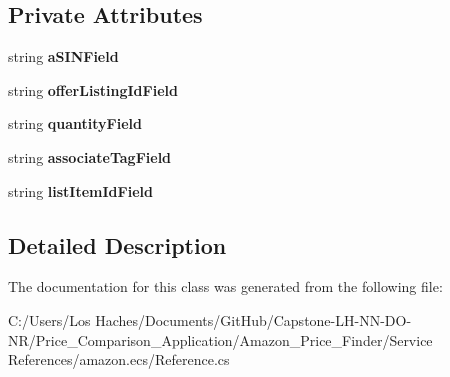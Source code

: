 \subsection*{Private Attributes}
\begin{DoxyCompactItemize}
\item 
\hypertarget{class_price___comparison_1_1amazon_1_1ecs_1_1_cart_add_request_item_ac2fea2ed9f0acc747e5529b82cb50a39}{string {\bfseries a\-S\-I\-N\-Field}}\label{class_price___comparison_1_1amazon_1_1ecs_1_1_cart_add_request_item_ac2fea2ed9f0acc747e5529b82cb50a39}

\item 
\hypertarget{class_price___comparison_1_1amazon_1_1ecs_1_1_cart_add_request_item_afa9c9ce1dae520a8c700be3c7fe5b7da}{string {\bfseries offer\-Listing\-Id\-Field}}\label{class_price___comparison_1_1amazon_1_1ecs_1_1_cart_add_request_item_afa9c9ce1dae520a8c700be3c7fe5b7da}

\item 
\hypertarget{class_price___comparison_1_1amazon_1_1ecs_1_1_cart_add_request_item_a71e664a982755bf687404fd293c7b9fe}{string {\bfseries quantity\-Field}}\label{class_price___comparison_1_1amazon_1_1ecs_1_1_cart_add_request_item_a71e664a982755bf687404fd293c7b9fe}

\item 
\hypertarget{class_price___comparison_1_1amazon_1_1ecs_1_1_cart_add_request_item_a043808d91c9a64d419dc628b14e016b3}{string {\bfseries associate\-Tag\-Field}}\label{class_price___comparison_1_1amazon_1_1ecs_1_1_cart_add_request_item_a043808d91c9a64d419dc628b14e016b3}

\item 
\hypertarget{class_price___comparison_1_1amazon_1_1ecs_1_1_cart_add_request_item_add2d2cb91cbfc86d1d65f4fd404da4aa}{string {\bfseries list\-Item\-Id\-Field}}\label{class_price___comparison_1_1amazon_1_1ecs_1_1_cart_add_request_item_add2d2cb91cbfc86d1d65f4fd404da4aa}

\end{DoxyCompactItemize}


\subsection{Detailed Description}


The documentation for this class was generated from the following file\-:\begin{DoxyCompactItemize}
\item 
C\-:/\-Users/\-Los Haches/\-Documents/\-Git\-Hub/\-Capstone-\/\-L\-H-\/\-N\-N-\/\-D\-O-\/\-N\-R/\-Price\-\_\-\-Comparison\-\_\-\-Application/\-Amazon\-\_\-\-Price\-\_\-\-Finder/\-Service References/amazon.\-ecs/Reference.\-cs\end{DoxyCompactItemize}
